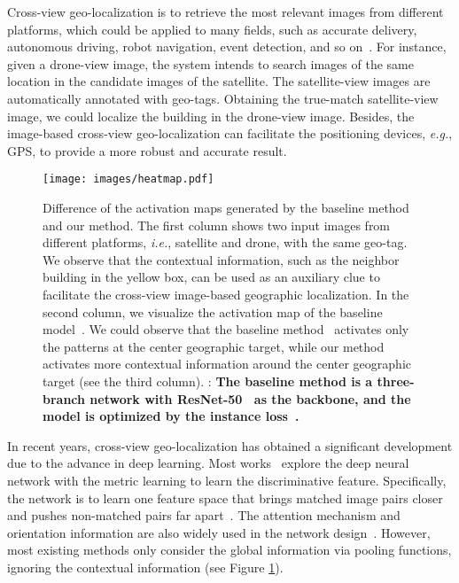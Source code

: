 \documentclass[journal]{IEEEtran}
\def\eg{\emph{e.g.}}
\def\ie{\emph{i.e.}}
\begin{document}
\IEEEPARstart
{C}{ross-view} geo-localization is to retrieve the most relevant images from different platforms, which could be applied to many fields, such as accurate delivery, autonomous driving, robot navigation, event detection, and so on~\cite{shi_spatial-aware_nodate,zheng_university-1652_nodate,workman_location_2015,liu_lending_2019}. For instance, given a drone-view image, the system intends to search images of the same location in the candidate images of the satellite. The satellite-view images are automatically annotated with geo-tags. Obtaining the true-match satellite-view image, we could localize the building in the drone-view image. Besides, the image-based cross-view geo-localization can facilitate the positioning devices, \eg, GPS, to provide a more robust and accurate result.
\par
\begin{figure}[htbp]
  \centering
  \texttt{[image: images/heatmap.pdf]}
  \caption{Difference of the activation maps generated by the baseline method~\cite{zheng_university-1652_nodate} and our method. The first column shows two input images from different platforms, \ie, satellite and drone, with the same geo-tag. We observe that the contextual information, such as the neighbor building in the yellow box, can be used as an auxiliary clue to facilitate the cross-view image-based geographic localization. 
  In the second column, we visualize the activation map of the baseline model~\cite{zheng_university-1652_nodate}. We could observe that the baseline method~\cite{zheng_university-1652_nodate} activates only the patterns at the center geographic target, while our method activates more contextual information around the center geographic target (see the third column). : \textbf{The baseline method is a three-branch network with ResNet-50~\cite{he2016deep} as the backbone, and the model is optimized by the instance loss~\cite{zheng2020dual}.}
  }
  \label{fig:1}
\end{figure}

In recent years, cross-view geo-localization has obtained a significant development due to the advance in deep learning. Most works~\cite{shi_spatial-aware_nodate,liu_lending_2019,shi_optimal_nodate,Shi_2020_CVPR,hu_cvm-net_2018} explore the deep neural network with the metric learning to learn the discriminative feature. Specifically, the network is to learn one feature space that brings matched image pairs closer and pushes non-matched pairs far apart~\cite{hadsell2006dimensionality,deng2018image,schroff2015facenet}. The attention mechanism and orientation information are also widely used in the network design~\cite{shi_spatial-aware_nodate,fu2019sta,liu_lending_2019}. However, most existing methods only consider the global information via pooling functions, ignoring the contextual information (see Figure \ref{fig:1}).  
\end{document}
